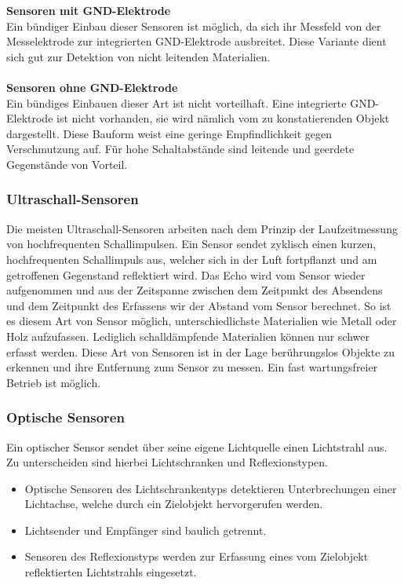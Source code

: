 \textbf{Sensoren mit GND-Elektrode} \\
Ein bündiger Einbau dieser Sensoren ist möglich, da sich ihr Messfeld von der Messelektrode zur integrierten GND-Elektrode ausbreitet.
Diese Variante dient sich gut zur Detektion von nicht leitenden Materialien. \\\\

\textbf{Sensoren ohne GND-Elektrode} \\
Ein bündiges Einbauen dieser Art ist nicht vorteilhaft.
Eine integrierte GND-Elektrode ist nicht vorhanden, sie wird nämlich vom zu konstatierenden Objekt dargestellt.
Diese Bauform weist eine geringe Empfindlichkeit gegen Verschmutzung auf.
Für hohe Schaltabstände sind leitende und geerdete Gegenstände von Vorteil.

\subsubsection{Ultraschall-Sensoren}
Die meisten Ultraschall-Sensoren arbeiten nach dem Prinzip der Laufzeitmessung von hochfrequenten Schallimpulsen.
Ein Sensor sendet zyklisch einen kurzen, hochfrequenten Schallimpuls aus, welcher sich in der Luft fortpflanzt und am getroffenen Gegenstand reflektiert wird.
Das Echo wird vom Sensor wieder aufgenommen und aus der Zeitspanne zwischen dem Zeitpunkt des Absendens und dem Zeitpunkt des Erfassens wir der Abstand vom Sensor berechnet.
So ist es diesem Art von Sensor möglich, unterschiedlichste Materialien wie Metall oder Holz aufzufassen.
Lediglich schalldämpfende Materialien können nur schwer erfasst werden.
Diese Art von Sensoren ist in der Lage berührungslos Objekte zu erkennen und ihre Entfernung zum Sensor zu messen.
Ein fast wartungsfreier Betrieb ist möglich.

\subsubsection{Optische Sensoren}
Ein optischer Sensor sendet über seine eigene Lichtquelle einen Lichtstrahl aus.
Zu unterscheiden sind hierbei Lichtschranken und Reflexionstypen.

\begin{itemize}
    \item Optische Sensoren des Lichtschrankentyps detektieren Unterbrechungen einer Lichtachse, welche durch ein Zielobjekt hervorgerufen werden.
    \item Lichtsender und Empfänger sind baulich getrennt.

    \item Sensoren des Reflexionstyps werden zur Erfassung eines vom Zielobjekt reflektierten Lichtstrahls eingesetzt.
\end{itemize}

